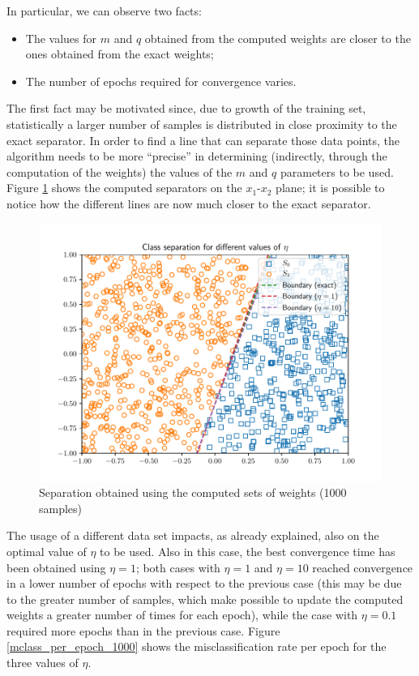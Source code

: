 \documentclass[letterpaper,headings=standardclasses]{scrartcl}
\begin{document}
In particular, we can observe two facts:

\begin{itemize}

\item The values for $m$ and $q$ obtained from the computed weights are closer to the ones obtained from the exact weights;

\item The number of epochs required for convergence varies.

\end{itemize}

The first fact may be motivated since, due to growth of the training set, statistically a larger number of samples is distributed in close proximity to the exact separator. In order to find a line that can separate those data points, the algorithm needs to be more “precise” in determining (indirectly, through the computation of the weights) the values of the $m$ and $q$ parameters to be used. Figure \ref{all_sep_1000} shows the computed separators on the $x_1$-$x_2$ plane; it is possible to notice how the different lines are now much closer to the exact separator.

\begin{figure}[h]
\centering
\includegraphics[width=0.7\linewidth]{all_sep_1000.pdf}
\caption{Separation obtained using the computed sets of weights (1000 samples)}
\label{all_sep_1000}
\end{figure}

The usage of a different data set impacts, as already explained, also on the optimal value of $\eta$ to be used. Also in this case, the best convergence time has been obtained using $\eta = 1$; both cases with $\eta = 1$ and $\eta = 10$ reached convergence in a lower number of epochs with respect to the previous case (this may be due to the greater number of samples, which make possible to update the computed weights a greater number of times for each epoch), while the case with $\eta = 0.1$ required more epochs than in the previous case. Figure \ref{mclass_per_epoch_1000} shows the misclassification rate per epoch for the three values of $\eta$.
\end{document}
